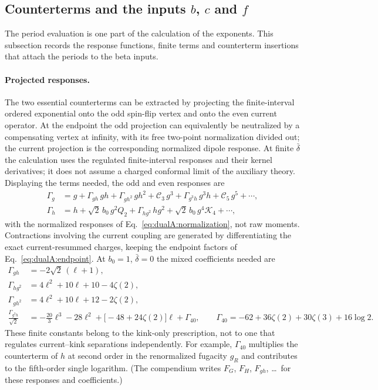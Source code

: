 \documentclass[11pt,a4paper]{article}
\numberwithin{equation}{section}
\newcommand{\db}{\bar\delta}
\begin{document}
\subsection{Counterterms and the inputs \texorpdfstring{$b$}{b}, \texorpdfstring{$c$}{c} and \texorpdfstring{$f$}{f}}\label{app:dualB:counterterms}
The period evaluation is one part of the calculation of the exponents. This subsection records the response
functions, finite terms and counterterm insertions that attach the periods to the beta inputs.

\paragraph{Projected responses.} The two essential counterterms can be extracted by projecting the finite-interval
ordered exponential onto the odd spin-flip vertex and onto the even current operator. At the endpoint the odd
projection can equivalently be neutralized by a compensating vertex at infinity, with its free two-point
normalization divided out; the current projection is the corresponding normalized dipole response. At finite $\db$ the
calculation uses the regulated finite-interval responses and their kernel derivatives; it does not assume a charged
conformal limit of the auxiliary theory. Displaying the terms needed, the odd and even responses are
\begin{equation}
\begin{aligned}
 \Gamma_g&=g+\Gamma_{gh}\,gh+\Gamma_{gh^2}\,gh^2+\mathcal C_3\,g^3+\Gamma_{g^3h}\,g^3h+\mathcal C_5\,g^5+\cdots,\\
 \Gamma_h&=h+\sqrt2\,b_0\,g^2Q_2+\Gamma_{hg^2}\,hg^2+\sqrt2\,b_0\,g^4\mathcal K_4+\cdots,
\end{aligned}
\label{eq:dualB:responsegen}
\end{equation}
with the normalized responses of Eq.~\eqref{eq:dualA:normalization}, not raw moments. Contractions involving the
current coupling are generated by differentiating the exact current-resummed charges, keeping the endpoint factors of
Eq.~\eqref{eq:dualA:endpoint}. At $b_0=1$, $\db=0$ the mixed coefficients needed are
\begin{equation}
\begin{aligned}
 \Gamma_{gh}&=-2\sqrt2\,(\ell+1),\\
 \Gamma_{hg^2}&=4\ell^2+10\ell+10-4\zeta(2),\\
 \Gamma_{gh^2}&=4\ell^2+10\ell+12-2\zeta(2),\\
 \frac{\Gamma_{g^3h}}{\sqrt2}&=-\frac{20}{3}\ell^3-28\ell^2+\bigl[-48+24\zeta(2)\bigr]\ell+\Gamma_{40},\qquad
 \Gamma_{40}=-62+36\zeta(2)+30\zeta(3)+16\log2.
\end{aligned}
\label{eq:dualB:mixed}
\end{equation}
These finite constants belong to the kink-only prescription, not to one that regulates current--kink separations
independently. For example, $\Gamma_{40}$ multiplies the counterterm of $h$ at second order in the renormalized fugacity $g_R$ and contributes to the
fifth-order single logarithm. (The compendium writes $F_G$, $F_H$, $F_{gh}$, \dots\ for these responses and
coefficients.)
\end{document}
